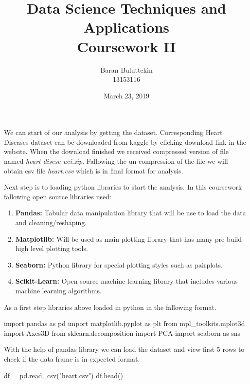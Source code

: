 \documentclass[12pt]{article}
\begin{document}
\author{Baran Buluttekin\\13153116}
\title{Data Science Techniques and Applications\\Coursework II}
\date{March 23, 2019}
\maketitle

\medskip

\indent We can start of our analysis by getting the dataset. Corresponding Heart Diseases dataset\cite{kaggle}\cite{uci-source} can be downloaded from kaggle by clicking download link in the website. When the download finished we received compressed version of file named \textit{heart-disese-uci.zip}. Fallowing the un-compression of the file we will obtain csv file \textit{heart.csv} which is in final format for analysis. 

Next step is to loading python libraries to start the analysis. In this coursework fallowing open source libraries used:
\begin{enumerate}
    \item \textbf{Pandas: }Tabular data manipulation library that will be use to load the data and cleaning/reshaping.\cite{mckinney-proc-scipy-2010}
    \item \textbf{Matplotlib: }Will be used as main plotting library that has many pre build high level plotting tools.\cite{matplotlib}
    \item \textbf{Seaborn: }Python library for special plotting styles such as pairplots.\cite{seaborn}
    \item \textbf{Scikit-Learn: }Open source machine learning library that includes various machine learning algorithms.\cite{scikit-learn}
\end{enumerate}

As a first step libraries above loaded in python in the fallowing format.

\begin{python}
    import pandas as pd
    import matplotlib.pyplot as plt
    from mpl_toolkits.mplot3d import Axes3D
    from sklearn.decomposition import PCA
    import seaborn as sns
\end{python}

With the help of pandas library we can load the dataset and view first 5 rows to check if the data frame is in expected format.

\begin{python}
    df = pd.read_csv("heart.csv")
    df.head()
\end{python}
\end{document}
